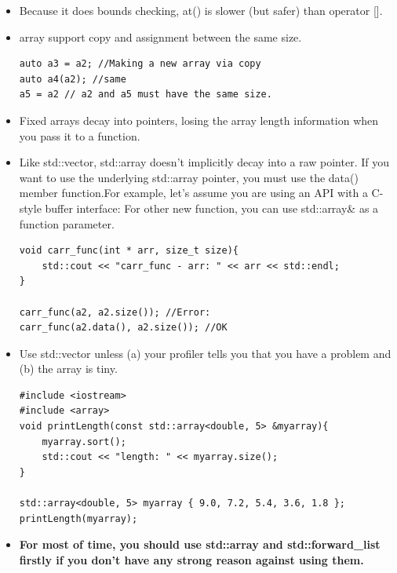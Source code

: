 \documentclass[a4paper,11pt,twoside]{book}
\begin{document}
\begin{itemize}
\item Because it does bounds checking, at() is slower (but safer) than operator [].

\item array support copy and assignment between the same size.
\begin{lstlisting}[numbers=none]
auto a3 = a2; //Making a new array via copy
auto a4(a2); //same
a5 = a2 // a2 and a5 must have the same size.
\end{lstlisting}


\item Fixed arrays decay into pointers, losing the array length information when you pass it to a function.

\item Like std::vector, std::array doesn't implicitly decay into a raw pointer. If you want to use the underlying std::array pointer, you must use the data() member function.For example, let's assume you are using an API with a C-style buffer interface: For other new function, you can use std::array\& as a function parameter. 

\begin{lstlisting}[numbers=none]
void carr_func(int * arr, size_t size){
    std::cout << "carr_func - arr: " << arr << std::endl;
}

carr_func(a2, a2.size()); //Error:
carr_func(a2.data(), a2.size()); //OK
\end{lstlisting}

\item Use std::vector unless (a) your profiler tells you that you have a problem and (b) the array is tiny.
\begin{lstlisting}[numbers=none]
#include <iostream>
#include <array>
void printLength(const std::array<double, 5> &myarray){
    myarray.sort();
    std::cout << "length: " << myarray.size();
}

std::array<double, 5> myarray { 9.0, 7.2, 5.4, 3.6, 1.8 };
printLength(myarray);
\end{lstlisting}


\item \textbf{For most of time, you should use std::array and std::forward\_list firstly if you don't have any strong reason against using them.} 
\end{itemize}
\end{document}
